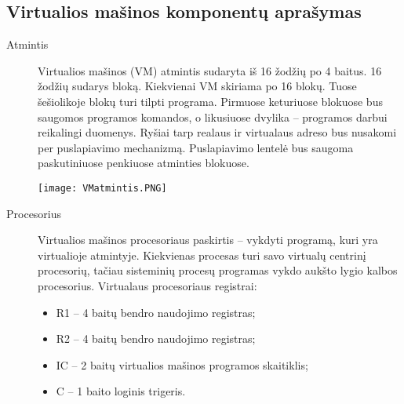 \subsection{Virtualios mašinos komponentų aprašymas}
\begin{description}
\item[Atmintis] \leavevmode 

Virtualios mašinos (VM) atmintis sudaryta iš 16 žodžių po 4 baitus. 16 žodžių sudarys bloką. Kiekvienai VM skiriama po 16 blokų. Tuose šešiolikoje blokų turi tilpti programa.
Pirmuose keturiuose blokuose bus saugomos programos komandos, o likusiuose dvylika – programos darbui reikalingi duomenys.
Ryšiai tarp realaus ir virtualaus adreso bus nusakomi per puslapiavimo mechanizmą. Puslapiavimo lentelė bus saugoma paskutiniuose penkiuose atminties blokuose.

\texttt{[image: VMatmintis.PNG]}

\item[Procesorius]  \leavevmode 
  
Virtualios mašinos procesoriaus paskirtis – vykdyti programą, kuri yra virtualioje atmintyje. Kiekvienas procesas turi savo virtualų centrinį procesorių, tačiau sisteminių procesų programas vykdo aukšto lygio kalbos procesorius. 
Virtualaus procesoriaus registrai:
\begin{itemize}
\item R1 – 4 baitų bendro naudojimo registras;
\item R2 – 4 baitų bendro naudojimo registras;
\item IC – 2 baitų virtualios mašinos programos skaitiklis;
\item C – 1 baito loginis trigeris.
\end{itemize}


\end{description}
